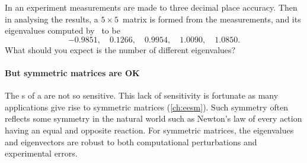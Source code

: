 \begin{example}
\begin{enumerate}
\end{enumerate}
\end{example}






\begin{activity}
In an experiment measurements are made to three decimal place accuracy.
Then in analysing the results, a \(5\times5\)~matrix is formed from the measurements, and its eigenvalues computed by \script\ to be
\begin{equation*}
-0.9851,\quad
0.1266,\quad
0.9954,\quad
1.0090,\quad
1.0850.
\end{equation*}
What should you expect is the number of different eigenvalues?
\end{activity}









\paragraph{But symmetric matrices are OK}
The s of a  are not so sensitive.
This lack of sensitivity is fortunate as many applications give rise to symmetric matrices (\autoref{ch:eesm}).
Such symmetry often reflects some symmetry in the natural world such as Newton's law of every action having an equal and opposite reaction.
For symmetric matrices, the eigenvalues and eigenvectors are robust to both computational perturbations and experimental errors.




